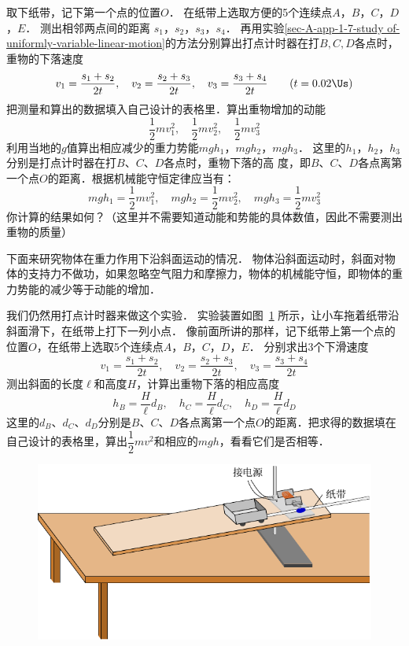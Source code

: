 取下纸带，记下第一个点的位置$O$．
在纸带上选取方便的5个连续点$A $，$ B $，$ C $，$ D $，$ E$．
测出相邻两点间的距离
$s_1 $，$ s_2 $，$ s_3 $，$ s_4$．
再用实验\ref{sec-A-app-1-7-study of-uniformly-variable-linear-motion}的方法分别算出打点计时器在打$B,C,D$各点时，重物的下落速度
\[v_1=\frac{s_1+s_2}{2t},\quad v_2=\frac{s_2+s_3}{2t},\quad v_3=\frac{s_3+s_4}{2t}\qquad (t=0.02 \Us) \]
把测量和算出的数据填入自己设计的表格里．算出重物增加的动能
\[\frac{1}{2}mv_1^2, \quad \frac{1}{2}mv_2^2, \quad \frac{1}{2}mv_3^2\]
利用当地的$g$值算出相应减少的重力势能$mgh_1 $，$ mgh_2 $，$ mgh_3$．
这里的$h_1 $，$ h_2 $，$ h_3$分别是打点计时器在打$B$、$C$、$D$各点时，重物下落的高
度，即$B$、$C$、$D$各点离第一个点$O$的距离．根据机械能守恒定律应当有：
\[mgh_1=\frac{1}{2}mv^2_1,\quad mgh_2=\frac{1}{2}mv^2_2,\quad mgh_3=\frac{1}{2}mv^2_3\]
你计算的结果如何？（这里并不需要知道动能和势能的具体数值，因此不需要测出重物的质量）

下面来研究物体在重力作用下沿斜面运动的情况．
物体沿斜面运动时，斜面对物体的支持力不做功，如果忽略空气阻力和摩擦力，物体的机械能守恒，即物体的重力势能的减少等于动能的增加．



我们仍然用打点计时器来做这个实验．
实验装置如图~\ref{fig_A_10-17} 所示，让小车拖着纸带沿斜面滑下，在纸带上打下一列小点．
像前面所讲的那样，记下纸带上第一个点的位置$O$，在纸带上选取5个连续点$A $，$ B $，$ C $，$ D $，$ E$．
分别求出3个下滑速度
\[v_1=\frac{s_1+s_2}{2t},\quad v_2=\frac{s_2+s_3}{2t},\quad v_3=\frac{s_3+s_4}{2t}\]
测出斜面的长度$\ell$和高度$H$，计算出重物下落的相应高度
\[h_B=\frac{H}{\ell}d_B, \quad h_C=\frac{H}{\ell}d_C, \quad h_D=\frac{H}{\ell}d_D \]
这里的$d_B$、$d_C$、$d_D$分别是$B$、$C$、$D$各点离第一个点$O$的距离．把求得的数据填在自己设计的表格里，算出$\dfrac{1}{2}mv^2$和相应的$mgh$，看看它们是否相等．


\begin{figure}[htbp]
	\centering
	\includegraphics{fig/A/10-17.pdf}
	\caption{}\label{fig_A_10-17}
\end{figure}


